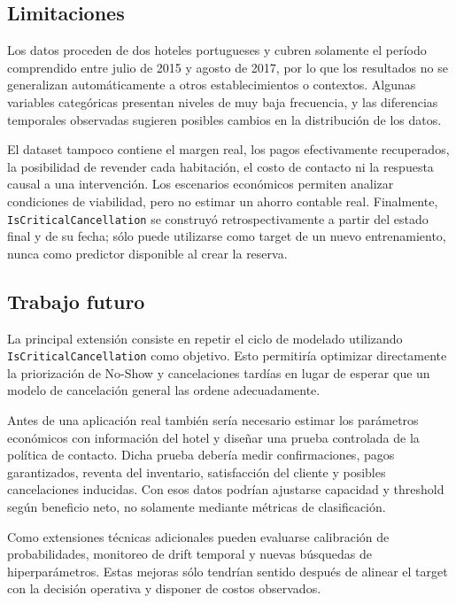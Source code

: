 \subsection{Limitaciones}

Los datos proceden de dos hoteles portugueses y cubren solamente el período
comprendido entre julio de 2015 y agosto de 2017, por lo que los resultados no
se generalizan automáticamente a otros establecimientos o contextos. Algunas
variables categóricas presentan niveles de muy baja frecuencia, y las
diferencias temporales observadas sugieren posibles cambios en la distribución
de los datos.

El dataset tampoco contiene el margen real, los pagos efectivamente
recuperados, la posibilidad de revender cada habitación, el costo de contacto
ni la respuesta causal a una intervención. Los escenarios económicos permiten
analizar condiciones de viabilidad, pero no estimar un ahorro contable real.
Finalmente, \texttt{IsCriticalCancellation} se construyó retrospectivamente a
partir del estado final y de su fecha; sólo puede utilizarse como target de un
nuevo entrenamiento, nunca como predictor disponible al crear la reserva.

\subsection{Trabajo futuro}

La principal extensión consiste en repetir el ciclo de modelado utilizando
\texttt{IsCriticalCancellation} como objetivo. Esto permitiría optimizar
directamente la priorización de No-Show y cancelaciones tardías en lugar de
esperar que un modelo de cancelación general las ordene adecuadamente.

Antes de una aplicación real también sería necesario estimar los parámetros
económicos con información del hotel y diseñar una prueba controlada de la
política de contacto. Dicha prueba debería medir confirmaciones, pagos
garantizados, reventa del inventario, satisfacción del cliente y posibles
cancelaciones inducidas. Con esos datos podrían ajustarse capacidad y
threshold según beneficio neto, no solamente mediante métricas de
clasificación.

Como extensiones técnicas adicionales pueden evaluarse calibración de
probabilidades, monitoreo de drift temporal y nuevas búsquedas de
hiperparámetros. Estas mejoras sólo tendrían sentido después de alinear el
target con la decisión operativa y disponer de costos observados.
